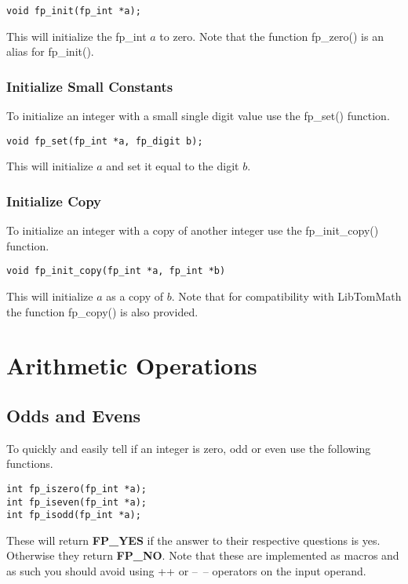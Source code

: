 \documentclass[b5paper]{book}
\begin{document}
\begin{verbatim}
void fp_init(fp_int *a);
\end{verbatim}

This will initialize the fp\_int $a$ to zero.  Note that the function fp\_zero() is an alias
for fp\_init().

\subsection{Initialize Small Constants}
To initialize an integer with a small single digit value use the fp\_set() function.

\begin{verbatim}
void fp_set(fp_int *a, fp_digit b);
\end{verbatim}

This will initialize $a$ and set it equal to the digit $b$.  

\subsection{Initialize Copy}
To initialize an integer with a copy of another integer use the fp\_init\_copy() function.

\begin{verbatim}
void fp_init_copy(fp_int *a, fp_int *b)
\end{verbatim}

This will initialize $a$ as a copy of $b$.  Note that for compatibility with LibTomMath the function
fp\_copy() is also provided.

\chapter{Arithmetic Operations}
\section{Odds and Evens}
To quickly and easily tell if an integer is zero, odd or even use the following functions.

  
\begin{verbatim}
int fp_iszero(fp_int *a);
int fp_iseven(fp_int *a);
int fp_isodd(fp_int *a);
\end{verbatim}

These will return \textbf{FP\_YES} if the answer to their respective questions is yes.  Otherwise they
return \textbf{FP\_NO}.  Note that these are implemented as macros and as such you should avoid using 
++ or --~-- operators on the input operand.
\end{document}
